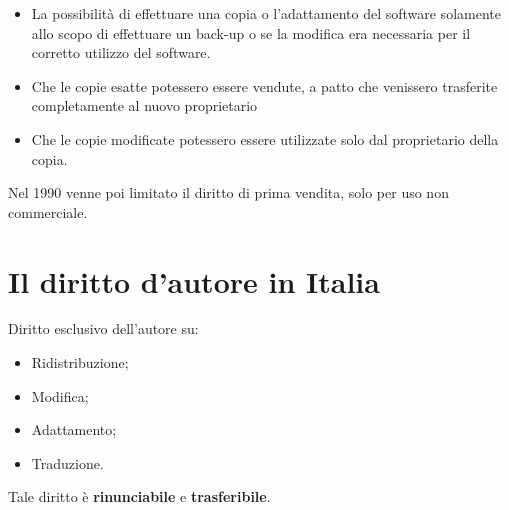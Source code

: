 \begin{itemize}
	\item La possibilità di effettuare una copia o l'adattamento del software solamente allo scopo di effettuare un back-up o se la modifica era necessaria per il corretto utilizzo del software.
	\item Che le copie esatte potessero essere vendute, a patto che venissero trasferite completamente al nuovo proprietario
	\item Che le copie modificate potessero essere utilizzate solo dal proprietario della copia.
\end{itemize}

Nel 1990 venne poi limitato il diritto di prima vendita, solo per uso non commerciale.

\section{Il diritto d'autore in Italia}

Diritto esclusivo dell'autore su:

\begin{itemize}

\item Ridistribuzione;
\item Modifica;
\item Adattamento;
\item Traduzione.

\end{itemize}

Tale diritto è \textbf{rinunciabile} e \textbf{trasferibile}.
